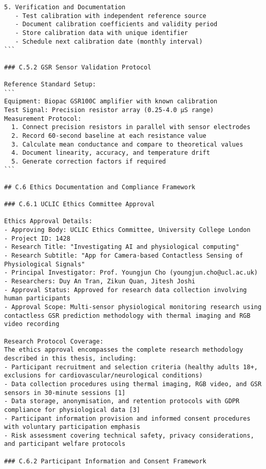 \begin{verbatim}
5. Verification and Documentation
   - Test calibration with independent reference source
   - Document calibration coefficients and validity period
   - Store calibration data with unique identifier
   - Schedule next calibration date (monthly interval)
```

### C.5.2 GSR Sensor Validation Protocol

Reference Standard Setup:
```
Equipment: Biopac GSR100C amplifier with known calibration
Test Signal: Precision resistor array (0.25-4.0 μS range)
Measurement Protocol:
  1. Connect precision resistors in parallel with sensor electrodes
  2. Record 60-second baseline at each resistance value
  3. Calculate mean conductance and compare to theoretical values
  4. Document linearity, accuracy, and temperature drift
  5. Generate correction factors if required
```

## C.6 Ethics Documentation and Compliance Framework

### C.6.1 UCLIC Ethics Committee Approval

Ethics Approval Details:
- Approving Body: UCLIC Ethics Committee, University College London
- Project ID: 1428
- Research Title: "Investigating AI and physiological computing"
- Research Subtitle: "App for Camera-based Contactless Sensing of Physiological Signals"
- Principal Investigator: Prof. Youngjun Cho (youngjun.cho@ucl.ac.uk)
- Researchers: Duy An Tran, Zikun Quan, Jitesh Joshi
- Approval Status: Approved for research data collection involving human participants
- Approval Scope: Multi-sensor physiological monitoring research using contactless GSR prediction methodology with thermal imaging and RGB video recording

Research Protocol Coverage:
The ethics approval encompasses the complete research methodology described in this thesis, including:
- Participant recruitment and selection criteria (healthy adults 18+, exclusions for cardiovascular/neurological conditions)
- Data collection procedures using thermal imaging, RGB video, and GSR sensors in 30-minute sessions [1]
- Data storage, anonymisation, and retention protocols with GDPR compliance for physiological data [3]
- Participant information provision and informed consent procedures with voluntary participation emphasis
- Risk assessment covering technical safety, privacy considerations, and participant welfare protocols

### C.6.2 Participant Information and Consent Framework


\end{verbatim}
